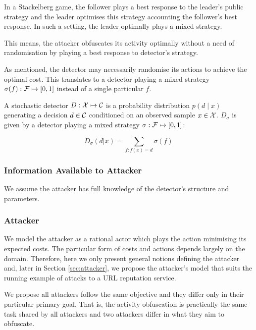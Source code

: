 In a Stackelberg game, the follower plays a best response to the leader's public strategy and the leader optimises this strategy accounting the follower's best response. In such a setting, the leader optimally plays a mixed strategy.

This means, the attacker obfuscates its activity optimally without a need of randomisation by playing a best response to detector's strategy.

As mentioned, the detector may necessarily randomise its actions to achieve the optimal cost. This translates to a detector playing a mixed strategy $\sigma(f) : \mathcal{F} \mapsto [ 0,1 ] $ instead of a single particular $f$.

\begin{definition}\label{def:stochastic-detector}
    A stochastic detector $D: \mathcal{X} \mapsto \mathcal{C}$ is a probability distribution $p(d \mid x )$ generating a decision $d \in \mathcal{C} $ conditioned on an observed sample $x \in \mathcal{X}$. $D_\sigma$ is given by a detector playing a mixed strategy $\sigma: \mathcal{F} \mapsto [0,1]$:

    \begin{equation}
        D_\sigma(d|x) = \sum_{f: f(x) = d} \sigma(f)
    \end{equation}

\end{definition}

\subsubsection{Information Available to Attacker}
We assume the attacker has full knowledge of the detector's structure and parameters.

\subsubsection{Attacker}
We model the attacker as a rational actor which plays the action minimising its expected costs. The particular form of costs and actions depends largely on the domain. Therefore, here we only present general notions defining the attacker and, later in Section \ref{sec:attacker}, we propose the attacker's model that suits the running example of attacks to a URL reputation service.

We propose all attackers follow the same objective and they differ only in their particular primary goal. That is, the activity obfuscation is practically the same task shared by all attackers and two attackers differ in what they aim to obfuscate.

